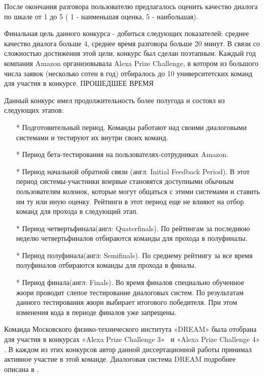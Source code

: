 После окончания разговора пользователю предлагалось оценить качество диалога по шкале от 1 до 5 ( 1 - наименьшая оценка, 5 - наибольшая). 

Финальная цель данного конкурса - добиться следующих показателей: среднее качество диалога больше 4, среднее время разговора больше 20 минут. В связи со сложностью достижения этой цели, конкурс был сделан поэтапным. Каждый год компания Amazon организовывала Alexa Prize Challenge, в котором из большого числа заявок (несколько сотен в год) отбиралось до 10 университетских команд для участия в конкурсе. ПРОШЕДШЕЕ ВРЕМЯ

Данный конкурс имел продолжительность более полугода и состоял из следующих этапов:
\begin{itemize}
\item[*] Подготовительный период. Команды работают над своими диалоговыми системами и тестируют их внутри своих команд.
\item[*] Период бета-тестирования на пользователях-сотрудниках Amazon.
\item[*] Период начальной обратной связи (англ: Initial Feedback Period). В этот период системы-участники впервые становятся доступными обычным пользователям колонок, которые могут общаться с этими системами и ставить им ту или иную оценку. Рейтинги в этот период еще не влияют на отбор команд для прохода в следующий этап.
\item[*] Период четвертьфинала(англ: Quaterfinals). По рейтингам за последнюю неделю четвертьфиналов отбираются команды для прохода в полуфиналы.
\item[*] Период полуфинала(англ: Semifinals). По среднему рейтингу за все время полуфиналов отбираются команды для прохода в финалы.
\item[*] Период финала(англ: Finals). Во время финалов специально обученное жюри проводит слепое тестирование диалоговых систем. По результатам данного тестирования жюри выбирает итогового победителя. При этом изменения кода в периоде финалов уже запрещены.
\end{itemize}

Команда Московского физико-технического института «DREAM» была отобрана для участия в конкурсах «Alexa Prize Challenge 3»~\cite{na_website_ndh} и «Alexa Prize Challenge 4» \cite{na_website_ndi}. В каждом из этих конкурсов автор данной диссертационной работы принимал активное участие в этой команде. Диалоговая система {DREAM} подробнее описана в \cite{dream1, dream1_trudy, dream2}.

